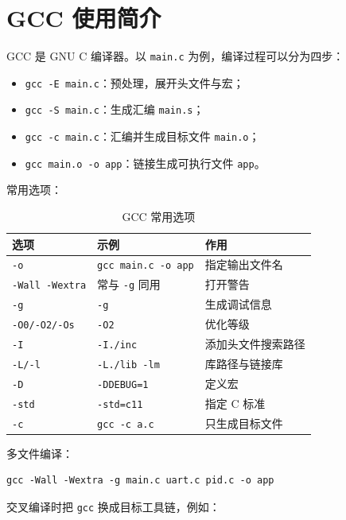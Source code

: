 \section{GCC 使用简介}

GCC 是 GNU C 编译器。以 \texttt{main.c} 为例，编译过程可以分为四步：

\begin{itemize}
\item \texttt{gcc -E main.c}：预处理，展开头文件与宏；
\item \texttt{gcc -S main.c}：生成汇编 \texttt{main.s}；
\item \texttt{gcc -c main.c}：汇编并生成目标文件 \texttt{main.o}；
\item \texttt{gcc main.o -o app}：链接生成可执行文件 \texttt{app}。
\end{itemize}

常用选项：

\begin{table}[htbp]
\centering \small \caption{GCC 常用选项} \label{tab:gcc-option}
    \begin{tabular}{lll}
        \toprule
        选项 & 示例 & 作用 \\
        \midrule
        \texttt{-o} & \texttt{gcc main.c -o app} & 指定输出文件名 \\
        \texttt{-Wall -Wextra} & 常与 \texttt{-g} 同用 & 打开警告 \\
        \texttt{-g} & \texttt{-g} & 生成调试信息 \\
        \texttt{-O0/-O2/-Os} & \texttt{-O2} & 优化等级 \\
        \texttt{-I} & \texttt{-I./inc} & 添加头文件搜索路径 \\
        \texttt{-L/-l} & \texttt{-L./lib -lm} & 库路径与链接库 \\
        \texttt{-D} & \texttt{-DDEBUG=1} & 定义宏 \\
        \texttt{-std} & \texttt{-std=c11} & 指定 C 标准 \\
        \texttt{-c} & \texttt{gcc -c a.c} & 只生成目标文件 \\
        \bottomrule
    \end{tabular}
\end{table}

多文件编译：

\begin{lstlisting}
gcc -Wall -Wextra -g main.c uart.c pid.c -o app
\end{lstlisting}

交叉编译时把 \texttt{gcc} 换成目标工具链，例如：

